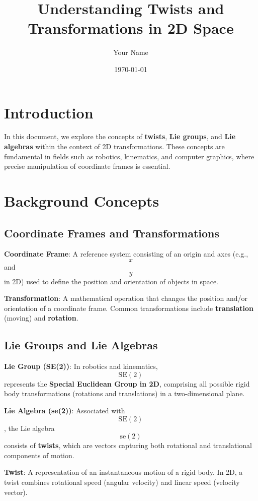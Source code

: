 \documentclass[12pt]{article}
\title{Understanding Twists and Transformations in 2D Space}
\author{Your Name}
\date{\today}
\begin{document}
\maketitle

\tableofcontents
\newpage

\section{Introduction}

In this document, we explore the concepts of \textbf{twists}, \textbf{Lie groups}, and \textbf{Lie algebras} within the context of 2D transformations. These concepts are fundamental in fields such as robotics, kinematics, and computer graphics, where precise manipulation of coordinate frames is essential.

\section{Background Concepts}

\subsection{Coordinate Frames and Transformations}

\textbf{Coordinate Frame}: A reference system consisting of an origin and axes (e.g., $$ x $$ and $$ y $$ in 2D) used to define the position and orientation of objects in space.

\textbf{Transformation}: A mathematical operation that changes the position and/or orientation of a coordinate frame. Common transformations include \textbf{translation} (moving) and \textbf{rotation}.

\subsection{Lie Groups and Lie Algebras}

\textbf{Lie Group (SE(2))}: In robotics and kinematics, $$\text{SE}(2)$$ represents the \textbf{Special Euclidean Group in 2D}, comprising all possible rigid body transformations (rotations and translations) in a two-dimensional plane.

\textbf{Lie Algebra (se(2))}: Associated with $$\text{SE}(2)$$, the Lie algebra $$\text{se}(2)$$ consists of \textbf{twists}, which are vectors capturing both rotational and translational components of motion.

\textbf{Twist}: A representation of an instantaneous motion of a rigid body. In 2D, a twist combines rotational speed (angular velocity) and linear speed (velocity vector).
\end{document}
